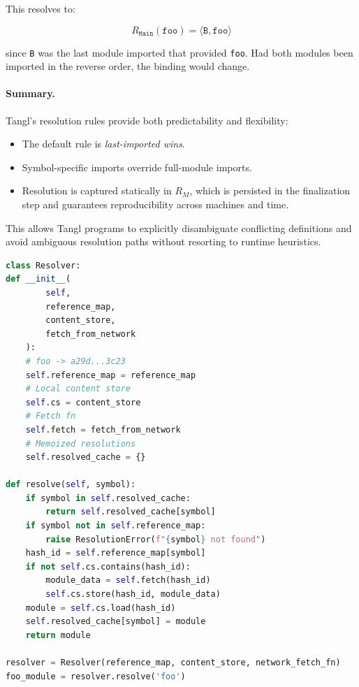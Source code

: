 \documentclass[sigplan,screen]{acmart}
\begin{document}
This resolves to:

\[
	R_{\texttt{Main}}(\texttt{foo}) = \langle \texttt{B}, \texttt{foo} \rangle
\]

since \texttt{B} was the last module imported that provided \texttt{foo}. Had both modules been imported in the reverse order, the binding would change.

\paragraph{Summary.}

Tangl's resolution rules provide both predictability and flexibility:

\begin{itemize}
	\item The default rule is \textit{last-imported wins}.
	\item Symbol-specific imports override full-module imports.
	\item Resolution is captured statically in $R_M$, which is persisted in the finalization step and guarantees reproducibility across machines and time.
\end{itemize}

This allows Tangl programs to explicitly disambiguate conflicting definitions and avoid ambiguous resolution paths without resorting to runtime heuristics.

\begin{lstlisting}[language=Python,
	caption={Lazy symbol resolution in the \texttt{Resolver} class},
	label={fig:lazy-resolution},
	basicstyle=\scriptsize\ttfamily,
	keywordstyle=\ttfamily,
	emphstyle=\ttfamily,
	commentstyle=\ttfamily,
	stringstyle=\ttfamily,
	breaklines=true,
	breakindent=0pt,
	frame=single,
	columns=fullflexible,
	keepspaces=true,
	showstringspaces=false,
]
class Resolver:
def __init__(
		self,
		reference_map,
		content_store,
		fetch_from_network
	):
	# foo -> a29d...3c23
	self.reference_map = reference_map
	# Local content store
	self.cs = content_store
	# Fetch fn
	self.fetch = fetch_from_network
	# Memoized resolutions
	self.resolved_cache = {}

def resolve(self, symbol):
	if symbol in self.resolved_cache:
		return self.resolved_cache[symbol]
	if symbol not in self.reference_map:
		raise ResolutionError(f"{symbol} not found")
	hash_id = self.reference_map[symbol]
	if not self.cs.contains(hash_id):
		module_data = self.fetch(hash_id)
		self.cs.store(hash_id, module_data)
	module = self.cs.load(hash_id)
	self.resolved_cache[symbol] = module
	return module

resolver = Resolver(reference_map, content_store, network_fetch_fn)
foo_module = resolver.resolve('foo')
\end{lstlisting}
\end{document}
